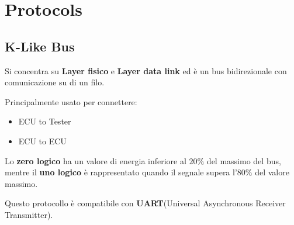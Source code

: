 \section{Protocols}


\subsection{K-Like Bus}

Si concentra su \textbf{Layer fisico} e \textbf{Layer data link} ed è un bus bidirezionale con comunicazione su di un filo.


Principalmente usato per connettere:
\begin{itemize}
  \item ECU to Tester
  \item ECU to ECU
\end{itemize}

Lo \textbf{zero logico} ha un valore di energia inferiore al $20\%$ del massimo del bus, mentre il \textbf{uno logico} è rappresentato quando il segnale supera l'$80\%$ del valore massimo.

Questo protocollo è compatibile con \textbf{UART}(Universal Asynchronous Receiver Transmitter).






